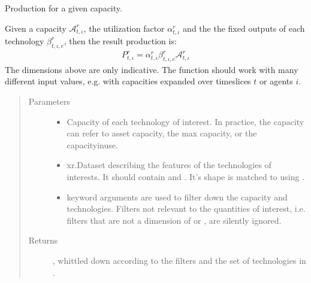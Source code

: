 \documentclass[letterpaper,10pt,english]{sphinxmanual}
\begin{document}
\begin{fulllineitems}
\label{\detokenize{api:muse.quantities.maximum_production}}
Production for a given capacity.

Given a capacity \(\mathcal{A}_{t, \iota}^r\), the utilization factor
\(\alpha^r_{t, \iota}\) and the the fixed outputs of each technology
\(\beta^r_{t, \iota, c}\), then the result production is:
\begin{equation*}
\begin{split}P_{t, \iota}^r =
    \alpha^r_{t, \iota}\beta^r_{t, \iota, c}\mathcal{A}_{t, \iota}^r\end{split}
\end{equation*}
The dimensions above are only indicative. The function should work with many
different input values, e.g. with capacities expanded over time\sphinxhyphen{}slices \(t\) or
agents \(i\).
\begin{quote}\begin{description}
\item[{Parameters}] \leavevmode\begin{itemize}
\item {} 
 \textendash{} Capacity of each technology of interest. In practice, the capacity can
refer to asset capacity, the max capacity, or the capacity\sphinxhyphen{}in\sphinxhyphen{}use.

\item {} 
 \textendash{} xr.Dataset describing the features of the technologies of
interests.  It should contain  and . It’s
shape is matched to  using .

\item {} 
 \textendash{} keyword arguments are used to filter down the capacity and
technologies. Filters not relevant to the quantities of interest, i.e.
filters that are not a dimension of  or , are
silently ignored.

\end{itemize}

\item[{Returns}] \leavevmode
{}, whittled down according to the
filters and the set of technologies in .

\end{description}\end{quote}

\end{fulllineitems}
\end{document}
